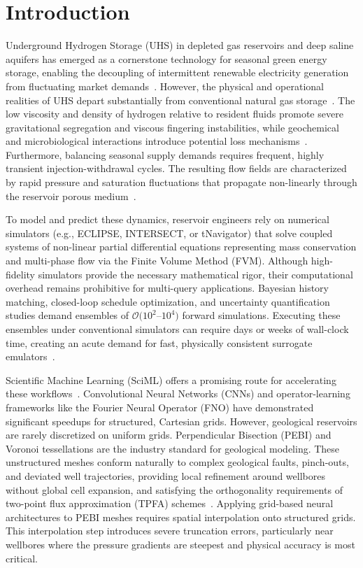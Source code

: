 \section{Introduction}
Underground Hydrogen Storage (UHS) in depleted gas reservoirs and deep saline aquifers has emerged as a cornerstone technology for seasonal green energy storage, enabling the decoupling of intermittent renewable electricity generation from fluctuating market demands~\cite{verma2024uhs}. However, the physical and operational realities of UHS depart substantially from conventional natural gas storage~\cite{pal2024uhsLithuania}. The low viscosity and density of hydrogen relative to resident fluids promote severe gravitational segregation and viscous fingering instabilities, while geochemical and microbiological interactions introduce potential loss mechanisms~\cite{heinemann2021}. Furthermore, balancing seasonal supply demands requires frequent, highly transient injection-withdrawal cycles. The resulting flow fields are characterized by rapid pressure and saturation fluctuations that propagate non-linearly through the reservoir porous medium~\cite{rashid2023geoenergy}.

To model and predict these dynamics, reservoir engineers rely on numerical simulators (e.g., ECLIPSE, INTERSECT, or tNavigator) that solve coupled systems of non-linear partial differential equations representing mass conservation and multi-phase flow via the Finite Volume Method (FVM). Although high-fidelity simulators provide the necessary mathematical rigor, their computational overhead remains prohibitive for multi-query applications. Bayesian history matching, closed-loop schedule optimization, and uncertainty quantification studies demand ensembles of $\mathcal{O}(10^2$--$10^4)$ forward simulations. Executing these ensembles under conventional simulators can require days or weeks of wall-clock time, creating an acute demand for fast, physically consistent surrogate emulators~\cite{pal2023ccs, pal2021mlhistory}.

Scientific Machine Learning (SciML) offers a promising route for accelerating these workflows~\cite{farchi2021}. Convolutional Neural Networks (CNNs) and operator-learning frameworks like the Fourier Neural Operator (FNO) have demonstrated significant speedups for structured, Cartesian grids. However, geological reservoirs are rarely discretized on uniform grids. Perpendicular Bisection (PEBI) and Voronoi tessellations are the industry standard for geological modeling. These unstructured meshes conform naturally to complex geological faults, pinch-outs, and deviated well trajectories, providing local refinement around wellbores without global cell expansion, and satisfying the orthogonality requirements of two-point flux approximation (TPFA) schemes~\cite{ahmed2015mpfa}. Applying grid-based neural architectures to PEBI meshes requires spatial interpolation onto structured grids. This interpolation step introduces severe truncation errors, particularly near wellbores where the pressure gradients are steepest and physical accuracy is most critical.

